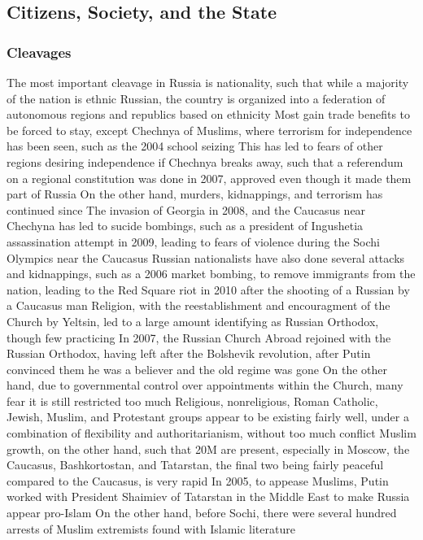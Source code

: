 \documentclass[11 pt, twoside]{article}
\newenvironment{outline*}
{
	\begin{outline}[enumerate]
	}
	{\end{outline}
}
\begin{document}
\subsection{Citizens, Society, and the State}
\subsubsection{Cleavages}
\begin{outline*}
\1 The most important cleavage in Russia is nationality, such that while a majority of the nation is ethnic Russian, the country is organized into a federation of autonomous regions and republics based on ethnicity
\2 Most gain trade benefits to be forced to stay, except Chechnya of Muslims, where terrorism for independence has been seen, such as the 2004 school seizing
\2 This has led to fears of other regions desiring independence if Chechnya breaks away, such that a referendum on a regional constitution was done in 2007, approved even though it made them part of Russia
\2 On the other hand, murders, kidnappings, and terrorism has continued since
\2 The invasion of Georgia in 2008, and the Caucasus near Chechyna has led to sucide bombings, such as a president of Ingushetia assassination attempt in 2009, leading to fears of violence during the Sochi Olympics near the Caucasus
\2 Russian nationalists have also done several attacks and kidnappings, such as a 2006 market bombing, to remove immigrants from the nation, leading to the Red Square riot in 2010 after the shooting of a Russian by a Caucasus man
\1 Religion, with the reestablishment and encouragment of the Church by Yeltsin, led to a large amount identifying as Russian Orthodox, though few practicing
\2 In 2007, the Russian Church Abroad rejoined with the Russian Orthodox, having left after the Bolshevik revolution, after Putin convinced them he was a believer and the old regime was gone
\3 On the other hand, due to governmental control over appointments within the Church, many fear it is still restricted too much
\2 Religious, nonreligious, Roman Catholic, Jewish, Muslim, and Protestant groups appear to be existing fairly well, under a combination of flexibility and authoritarianism, without too much conflict
\3 Muslim growth, on the other hand, such that 20M are present, especially in Moscow, the Caucasus, Bashkortostan, and Tatarstan, the final two being fairly peaceful compared to the Caucasus, is very rapid
\3 In 2005, to appease Muslims, Putin worked with President Shaimiev of Tatarstan in the Middle East to make Russia appear pro-Islam
\3 On the other hand, before Sochi, there were several hundred arrests of Muslim extremists found with Islamic literature

\end{outline*}
\end{document}
